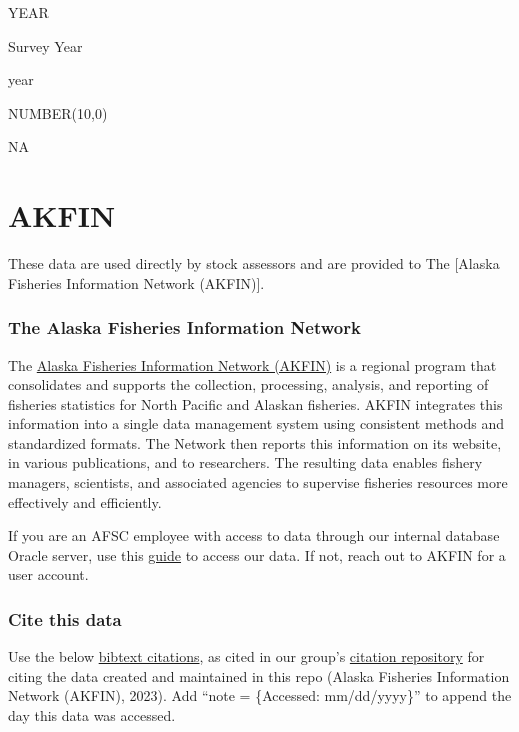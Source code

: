 \documentclass[
  letterpaper,
  oneside,
  open=any]{scrbook}
\begin{document}
YEAR

Survey Year

year

NUMBER(10,0)

NA

\part{AKFIN}

These data are used directly by stock assessors and are provided to The
{[}Alaska Fisheries Information Network (AKFIN){]}.

\hypertarget{the-alaska-fisheries-information-network}{%
\section*{The Alaska Fisheries Information
Network}\label{the-alaska-fisheries-information-network}}


The
\href{https://www.psmfc.org/program/alaska-fisheries-information-network-akfin}{Alaska
Fisheries Information Network (AKFIN)} is a regional program that
consolidates and supports the collection, processing, analysis, and
reporting of fisheries statistics for North Pacific and Alaskan
fisheries. AKFIN integrates this information into a single data
management system using consistent methods and standardized formats. The
Network then reports this information on its website, in various
publications, and to researchers. The resulting data enables fishery
managers, scientists, and associated agencies to supervise fisheries
resources more effectively and efficiently.

If you are an AFSC employee with access to data through our internal
database Oracle server, use this
\href{https://afsc-gap-products.github.io/gap_products/content/akfin-oracle-sql-r.html}{guide}
to access our data. If not, reach out to AKFIN for a user account.

\hypertarget{cite-this-data-1}{%
\section*{Cite this data}\label{cite-this-data-1}}


Use the below
\href{https://github.com/afsc-gap-products/gap_products/blob/main/code/CITATION_GAPakfin.bib}{bibtext
citations}, as cited in our group's
\href{https://github.com/afsc-gap-products/citations/blob/main/cite/bibliography.bib}{citation
repository} for citing the data created and maintained in this repo
(Alaska Fisheries Information Network (AKFIN), 2023). Add ``note =
\{Accessed: mm/dd/yyyy\}'' to append the day this data was accessed.
\end{document}
